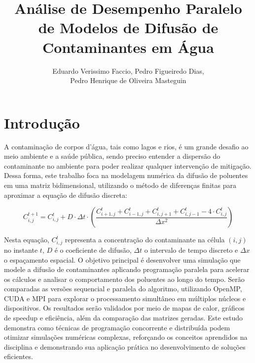 \documentclass[12pt]{article}
\title{Análise de Desempenho Paralelo de Modelos de Difusão de Contaminantes em
  Água}
\author{Eduardo Verissimo Faccio, Pedro Figueiredo Dias, \\
  Pedro Henrique de Oliveira Masteguin}
\begin{document}
\maketitle


\section{Introdução}

A contaminação de corpos d'água, tais como lagos e rios, é um grande desafio ao
meio ambiente e a saúde pública, sendo preciso entender a dispersão do contaminante no
ambiente para poder realizar qualquer intervenção de
mitigação. Dessa forma, este trabalho foca na modelagem numérica da
difusão de poluentes em uma matriz bidimensional, utilizando o método de
diferenças finitas para aproximar a equação de difusão discreta:

\begin{equation}
  C_{i,j}^{t+1} = C_{i,j}^t + D \cdot \Delta t \cdot \left( \frac{C_{i+1,j}^t +
    C_{i-1,j}^t + C_{i,j+1}^t + C_{i,j-1}^t - 4 \cdot C_{i,j}^t}{\Delta x^2}
  \right)
  \label{eq:Difusao}
\end{equation}

Nesta equação, $C_{i,j}^t$ representa a concentração do contaminante na célula
$(i,j)$ no instante $t$, $D$ é o coeficiente de difusão, $\Delta t$ o intervalo
de tempo discreto e
$\Delta x$ o espaçamento espacial. O objetivo principal é desenvolver uma
simulação que modele a difusão de contaminantes aplicando programação paralela
para acelerar os cálculos e analisar o comportamento dos poluentes ao longo do
tempo. Serão comparadas as versões sequencial e paralela do algoritmo,
utilizando OpenMP, CUDA e MPI para explorar o processamento simultâneo em
múltiplos núcleos e dispositivos. Os resultados serão validados por meio de
mapas de calor, gráficos de speedup e eficiência, além da comparação das
matrizes geradas. Este estudo demonstra como técnicas de programação
concorrente e distribuída podem otimizar simulações numéricas complexas,
reforçando os conceitos aprendidos na disciplina e demonstrando sua aplicação
prática no desenvolvimento de soluções eficientes.
\end{document}
